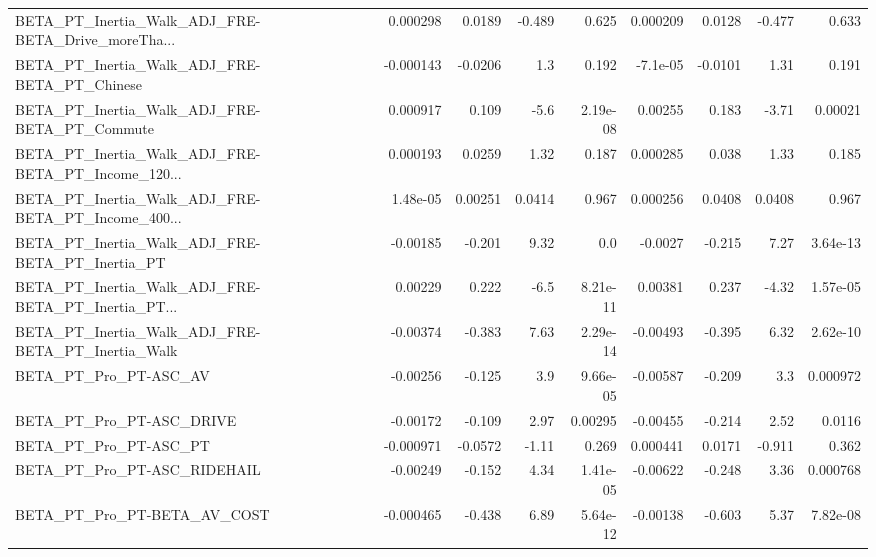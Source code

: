 \begin{tabular}{lrrrrrrrr}
BETA\_PT\_Inertia\_Walk\_ADJ\_FRE-BETA\_Drive\_moreTha... &    0.000298 &       0.0189 &   -0.489 &    0.625 &   0.000209 &      0.0128 &       -0.477 &         0.633 \\
BETA\_PT\_Inertia\_Walk\_ADJ\_FRE-BETA\_PT\_Chinese       &   -0.000143 &      -0.0206 &      1.3 &    0.192 &   -7.1e-05 &     -0.0101 &         1.31 &         0.191 \\
BETA\_PT\_Inertia\_Walk\_ADJ\_FRE-BETA\_PT\_Commute       &    0.000917 &        0.109 &     -5.6 & 2.19e-08 &    0.00255 &       0.183 &        -3.71 &       0.00021 \\
BETA\_PT\_Inertia\_Walk\_ADJ\_FRE-BETA\_PT\_Income\_120... &    0.000193 &       0.0259 &     1.32 &    0.187 &   0.000285 &       0.038 &         1.33 &         0.185 \\
BETA\_PT\_Inertia\_Walk\_ADJ\_FRE-BETA\_PT\_Income\_400... &    1.48e-05 &      0.00251 &   0.0414 &    0.967 &   0.000256 &      0.0408 &       0.0408 &         0.967 \\
BETA\_PT\_Inertia\_Walk\_ADJ\_FRE-BETA\_PT\_Inertia\_PT    &    -0.00185 &       -0.201 &     9.32 &      0.0 &    -0.0027 &      -0.215 &         7.27 &      3.64e-13 \\
BETA\_PT\_Inertia\_Walk\_ADJ\_FRE-BETA\_PT\_Inertia\_PT... &     0.00229 &        0.222 &     -6.5 & 8.21e-11 &    0.00381 &       0.237 &        -4.32 &      1.57e-05 \\
BETA\_PT\_Inertia\_Walk\_ADJ\_FRE-BETA\_PT\_Inertia\_Walk  &    -0.00374 &       -0.383 &     7.63 & 2.29e-14 &   -0.00493 &      -0.395 &         6.32 &      2.62e-10 \\
BETA\_PT\_Pro\_PT-ASC\_AV                              &    -0.00256 &       -0.125 &      3.9 & 9.66e-05 &   -0.00587 &      -0.209 &          3.3 &      0.000972 \\
BETA\_PT\_Pro\_PT-ASC\_DRIVE                           &    -0.00172 &       -0.109 &     2.97 &  0.00295 &   -0.00455 &      -0.214 &         2.52 &        0.0116 \\
BETA\_PT\_Pro\_PT-ASC\_PT                              &   -0.000971 &      -0.0572 &    -1.11 &    0.269 &   0.000441 &      0.0171 &       -0.911 &         0.362 \\
BETA\_PT\_Pro\_PT-ASC\_RIDEHAIL                        &    -0.00249 &       -0.152 &     4.34 & 1.41e-05 &   -0.00622 &      -0.248 &         3.36 &      0.000768 \\
BETA\_PT\_Pro\_PT-BETA\_AV\_COST                        &   -0.000465 &       -0.438 &     6.89 & 5.64e-12 &   -0.00138 &      -0.603 &         5.37 &      7.82e-08 \\

\end{tabular}
